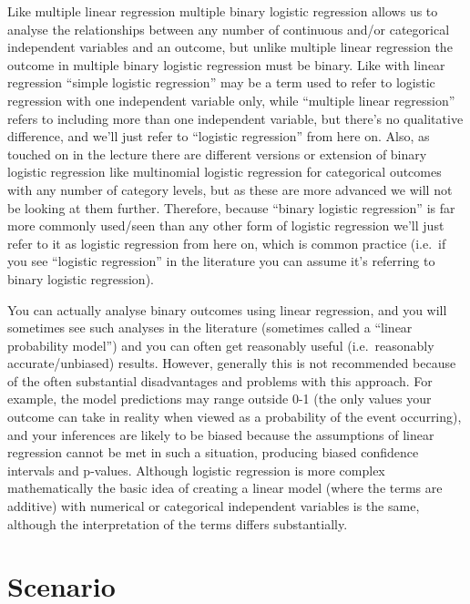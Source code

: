 \documentclass[
]{book}
\begin{document}
Like multiple linear regression multiple binary logistic regression allows us to analyse the relationships between any number of continuous and/or categorical independent variables and an outcome, but unlike multiple linear regression the outcome in multiple binary logistic regression must be binary. Like with linear regression ``simple logistic regression'' may be a term used to refer to logistic regression with one independent variable only, while ``multiple linear regression'' refers to including more than one independent variable, but there's no qualitative difference, and we'll just refer to ``logistic regression'' from here on. Also, as touched on in the lecture there are different versions or extension of binary logistic regression like multinomial logistic regression for categorical outcomes with any number of category levels, but as these are more advanced we will not be looking at them further. Therefore, because ``binary logistic regression'' is far more commonly used/seen than any other form of logistic regression we'll just refer to it as logistic regression from here on, which is common practice (i.e.~if you see ``logistic regression'' in the literature you can assume it's referring to binary logistic regression).

You can actually analyse binary outcomes using linear regression, and you will sometimes see such analyses in the literature (sometimes called a ``linear probability model'') and you can often get reasonably useful (i.e.~reasonably accurate/unbiased) results. However, generally this is not recommended because of the often substantial disadvantages and problems with this approach. For example, the model predictions may range outside 0-1 (the only values your outcome can take in reality when viewed as a probability of the event occurring), and your inferences are likely to be biased because the assumptions of linear regression cannot be met in such a situation, producing biased confidence intervals and p-values. Although logistic regression is more complex mathematically the basic idea of creating a linear model (where the terms are additive) with numerical or categorical independent variables is the same, although the interpretation of the terms differs substantially.

\hypertarget{scenario-12}{%
\section{Scenario}\label{scenario-12}}
\end{document}

